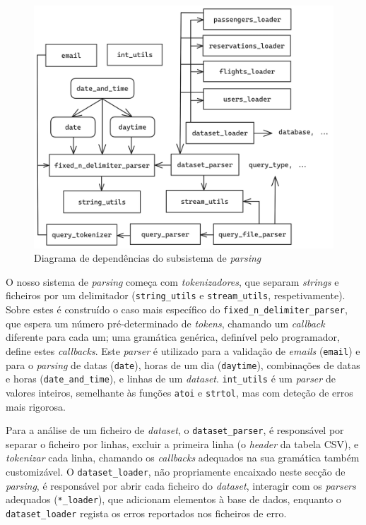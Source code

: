 \documentclass[12pt, a4paper]{article}
\begin{document}
\begin{figure}[ht]
    \centering
    \includegraphics[scale=0.17]{res/parsing.png}
    \caption{Diagrama de dependências do subsistema de \emph{parsing}}
    \label{fig:parsing}
\end{figure}

O nosso sistema de \emph{parsing} começa com \emph{tokenizadores}, que separam \emph{strings} e
ficheiros por um delimitador (\texttt{string\_utils} e \texttt{stream\_utils}, respetivamente).
Sobre estes é construído o caso mais específico do \texttt{fixed\_n\_delimiter\_parser}, que espera
um número pré-determinado de \emph{tokens}, chamando um \emph{callback} diferente para cada um; uma
gramática genérica, definível pelo programador, define estes \emph{callbacks}. Este \emph{parser}
é utilizado para a validação de \emph{emails} (\texttt{email}) e para o \emph{parsing} de datas
(\texttt{date}), horas de um dia (\texttt{daytime}), combinações de datas e horas
(\texttt{date\_and\_time}), e linhas de um \emph{dataset}. \texttt{int\_utils} é um \emph{parser}
de valores inteiros, semelhante às funções \texttt{atoi} e \texttt{strtol}, mas com deteção de erros
mais rigorosa.

Para a análise de um ficheiro de \emph{dataset}, o \texttt{dataset\_parser}, é responsável por
separar o ficheiro por linhas, excluir a primeira linha (o \emph{header} da tabela CSV), e
\emph{tokenizar} cada linha, chamando os \emph{callbacks} adequados na sua gramática também
customizável. O \texttt{dataset\_loader}, não propriamente encaixado neste secção de
\emph{parsing}, é responsável por abrir cada ficheiro do \emph{dataset}, interagir com os
\emph{parsers} adequados (\texttt{*\_loader}), que adicionam elementos à base de dados, enquanto
o \texttt{dataset\_loader} regista os erros reportados nos ficheiros de erro.
\end{document}
